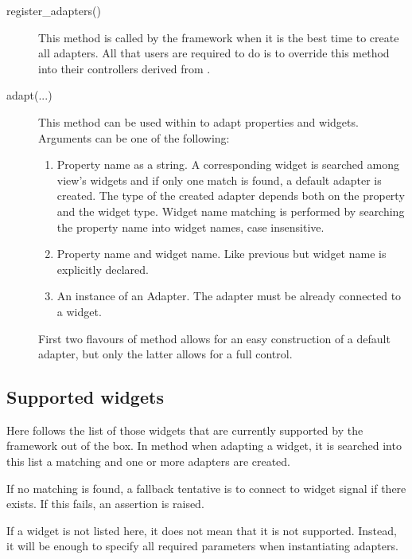 \begin{description} 
\item [register\_adapters()] This method is called by the framework
  when it is the best time to create all adapters. All that users
  are required to do is to override this method into their
  controllers derived from .

\item [adapt(...)] This method can be used within
   to adapt properties and
  widgets. Arguments can be one of the following:

  \begin{enumerate}
  \item Property name as a string. A corresponding widget is
    searched among view's widgets and if only one match is found, a
    default adapter is created. The type of the created adapter
    depends both on the property and the widget type. Widget name
    matching is performed by searching the property name into widget
    names, case insensitive.

  \item Property name and widget name. Like previous but widget name
    is explicitly declared.

  \item An instance of an Adapter. The adapter must be already
    connected to a widget.
  \end{enumerate}

  First two flavours of method  allows for an easy
  construction of a default adapter, but only the latter allows for
  a full control.

\end{description}


\subsection{Supported widgets}
\label{SUPW}

Here follows the list of those widgets that are currently supported
by the framework out of the box. In method
 when adapting a widget, it is searched
into this list a matching and one or more adapters are created.

If no matching is found, a fallback tentative is to connect to
widget signal  if there exists. If this fails,
an assertion is raised.

If a widget is not listed here, it does not mean that it is not
supported. Instead, it will be enough to specify all required
parameters when instantiating adapters.


